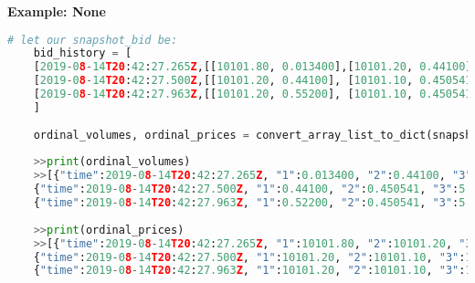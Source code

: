 \textbf{Example: None}
\begin{lstlisting}[language=Python]
	# let our snapshot_bid be:
	bid_history = [
	[2019-08-14T20:42:27.265Z,[[10101.80, 0.013400],[10101.20, 0.44100], [10101.10, 0.450541], [10100.55, 5.24501], [10099.00, 10.24511], [10090.11, 24.21395]]],
	[2019-08-14T20:42:27.500Z,[[10101.20, 0.44100], [10101.10, 0.450541], [10100.55, 5.24501], [10099.00, 10.24511], [10090.11, 24.21395],[10090.05]] ],
	[2019-08-14T20:42:27.963Z,[[10101.20, 0.55200], [10101.10, 0.450541], [10100.55, 5.24501], [10099.00, 10.24511], [10090.11, 24.21395]]]
	]
	
	ordinal_volumes, ordinal_prices = convert_array_list_to_dict(snapshot)
	
	>>print(ordinal_volumes)
	>>[{"time":2019-08-14T20:42:27.265Z, "1":0.013400, "2":0.44100, "3":0.450541, "4":5.24501, "5":10.24511},
	{"time":2019-08-14T20:42:27.500Z, "1":0.44100, "2":0.450541, "3":5.24501, "4":10.24511, "5":24.21395},
	{"time":2019-08-14T20:42:27.963Z, "1":0.52200, "2":0.450541, "3":5.24501, "4":10.24511, "5":2421395}]
	
	>>print(ordinal_prices)
	>>[{"time":2019-08-14T20:42:27.265Z, "1":10101.80, "2":10101.20, "3":10101.10, "4":10100.55, "5":10099.00},
	{"time":2019-08-14T20:42:27.500Z, "1":10101.20, "2":10101.10, "3":10100.55, "4":10099.00, "5":10090.11},
	{"time":2019-08-14T20:42:27.963Z, "1":10101.20, "2":10101.10, "3":10100.55, "4":10099.00, "5":10090.11}]
\end{lstlisting}